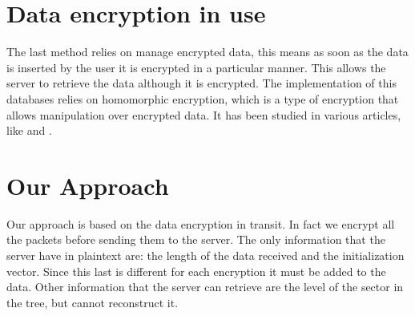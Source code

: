 \section{Data encryption in use}
The last method relies on manage encrypted data, this means as soon as the data is inserted by the user it is encrypted in a particular manner. This allows the server to retrieve the data although it is encrypted. The implementation of this databases relies on homomorphic encryption, which is a type of encryption that allows manipulation over encrypted data\cite{homo1}\cite{homo2}. It has been studied in various articles, like \cite{tamper} and \cite{hard}.

\section{Our Approach}
Our approach is based on the data encryption in transit. In fact we encrypt all the packets before sending them to the server. The only information that the server have in plaintext are: the length of the data received and the initialization vector. Since this last is different for each encryption it must be added to the data. Other information that the server can retrieve are the level of the sector in the tree, but cannot reconstruct it. 